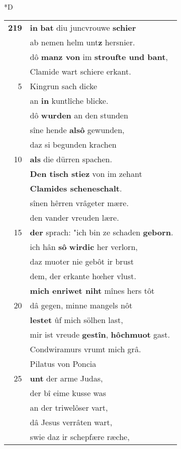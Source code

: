 \documentclass[8pt,a4paper,notitlepage]{article}
\begin{document}
\begin{table}[ht]
\begin{minipage}[t]{0.5\linewidth}
\small
\begin{center}*D
\end{center}
\begin{tabular}{rl}
\textbf{219} & \textbf{in} \textbf{bat} diu juncvrouwe \textbf{schier}\\ 
 & ab nemen helm unt\textbf{z} hersnier.\\ 
 & dô \textbf{manz von} im \textbf{stroufte und bant},\\ 
 & Clamide wart schiere erkant.\\ 
5 & Kingrun sach dicke\\ 
 & an \textbf{in} kuntlîche blicke.\\ 
 & dô \textbf{wurden} an den stunden\\ 
 & sîne hende \textbf{alsô} gewunden,\\ 
 & daz si begunden krachen\\ 
10 & \textbf{als} die dürren spachen.\\ 
 & \textbf{Den tisch stiez} von im zehant\\ 
 & \textbf{Clamides scheneschalt}.\\ 
 & sînen hêrren vrâgeter mære.\\ 
 & den vander vreuden lære.\\ 
15 & \textbf{der} sprach: "ich bin ze schaden \textbf{geborn}.\\ 
 & ich hân \textbf{sô} \textbf{wirdic} her verlorn,\\ 
 & daz muoter nie gebôt ir brust\\ 
 & dem, der erkante hœher vlust.\\ 
 & \textbf{mich enriwet niht} mînes hers tôt\\ 
20 & dâ gegen, minne mangels nôt\\ 
 & \textbf{lestet} ûf mich sölhen last,\\ 
 & mir ist vreude \textbf{gestîn}, \textbf{hôchmuot} gast.\\ 
 & Condwiramurs vrumt mich grâ.\\ 
 & Pilatus von Poncia\\ 
25 & \textbf{unt} der arme Judas,\\ 
 & der bî eime kusse was\\ 
 & an der triwelôser vart,\\ 
 & dâ Jesus verrâten wart,\\ 
 & swie daz ir schepfære ræche,\\ 

\end{tabular}
\end{minipage}
\end{table}
\end{document}
